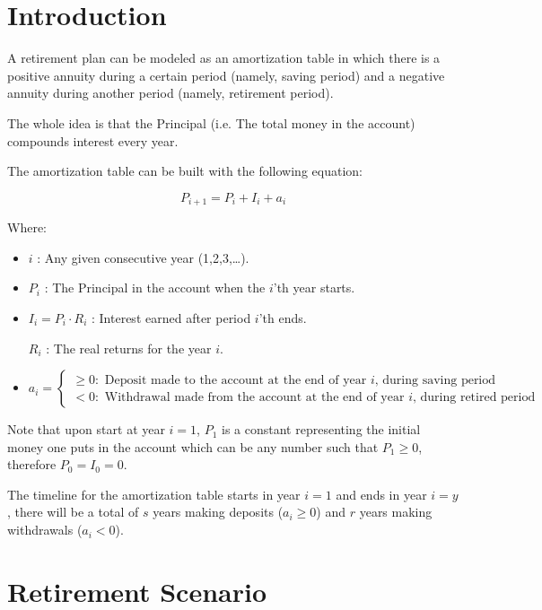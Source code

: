 \documentclass[8pt]{article}
\begin{document}
\section{Introduction}


A retirement plan can be modeled as an amortization table in which there is a positive annuity during a certain period (namely, saving period) and a negative annuity during another period (namely, retirement period).


The whole idea is that the Principal (i.e. The total money in the account) compounds interest every year.


The amortization table can be built with the following equation:

\[P_{i+1} = P_i + I_i + a_i\]

Where:
\begin{itemize}
\item $i$ : Any given consecutive year (1,2,3,\ldots).
\item $P_i$ : The Principal in the account when the $i$'th year starts.
\item $I_i = P_i \cdot R_i$ : Interest earned after period $i$'th ends.

$R_i$ : The real returns for the year $i$.
\item $a_i =
\begin{cases}
\geq 0: \text{ Deposit made to the account at the end of year $i$, during saving period} \\
< 0: \text{ Withdrawal made from the account at the end of year $i$, during retired period}
\end{cases} $

\end{itemize}

Note that upon start at year $i=1$, $P_1$ is a constant representing the initial money one puts in the account which can be any number such that $P_1\geq 0$, therefore $P_0=I_0=0$.

The timeline for the amortization table starts in year $i=1$ and ends in year $i=y$, there will be a total of $s$ years making deposits ($a_i \geq 0$) and $r$ years making withdrawals ($a_i < 0$).

\section{Retirement Scenario}
\end{document}
